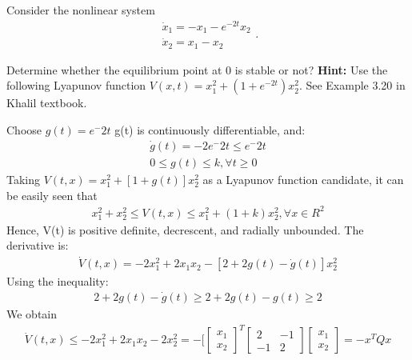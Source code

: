 \begin{problem}[20]
Consider the nonlinear system
$$
\begin{array}{l}
\dot{x}_1=-x_1-e^{-2 t} x_2 \\
\dot{x}_2=x_1-x_2
\end{array}.
$$

Determine whether the equilibrium point at 0 is stable or not?
\textbf{Hint:} Use the following Lyapunov function $V(x, t)=x_1^2+\left(1+e^{-2 t}\right) x_2^2$. See Example 3.20 in Khalil textbook.
\end{problem}


\begin{answer}
    Choose $g(t)=e^-2t$
    g(t) is continuously differentiable, and:
    \begin{align*}
    \dot{g}(t) = -2e^-2t \leq e^-2t\\
    0 \leq g(t) \leq k, \forall t \geq 0
    \end{align*}
    Taking $V(t,x) = x_1^2 + [1+g(t)]x_2^2$ as a Lyapunov function candidate, it can be easily seen that
    \begin{align*}
    x_1^2+x_2^2 \leq V(t,x) \leq x_1^2+(1+k)x_2^2, \forall x \in R^2
    \end{align*}
    Hence, V(t) is positive definite, decrescent, and radially unbounded. The derivative is:
    \begin{align*}
    \dot{V}(t,x) = -2x_1^2 + 2x_1x_2-[2+2g(t)-\dot{g}(t)]x_2^2
    \end{align*}
    Using the inequality:
    \begin{align*}
    2+2g(t)-\dot{g}(t) \geq 2 + 2g(t) - g(t) \geq 2
    \end{align*}
    We obtain
    \begin{align*}
    \dot{V}(t,x) \leq -2x_1^2 + 2x_1x_2-2x_2^2 = - [ \begin{bmatrix}
    x_1\\
    x_2
\end{bmatrix}  ^T
 \begin{bmatrix}
    2&-1\\
    -1&2
\end{bmatrix}
\begin{bmatrix}
    x_1\\
    x_2
\end{bmatrix} = -x^TQx
    \end{align*}
\end{answer}

